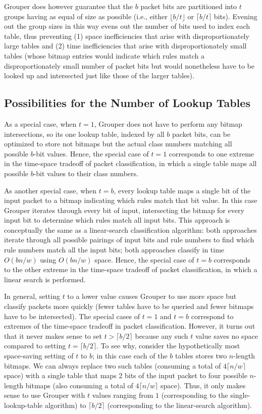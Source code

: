 \documentclass[10pt, conference, compsocconf]{IEEEtran}
\begin{document}
Grouper does however guarantee that the $b$ packet bits are partitioned into $t$
groups having as equal of size as possible (i.e., either $\lfloor b/t\rfloor$ or
$\lceil b/t\rceil$ bits).  Evening out the group sizes in this way evens out the
number of bits used to index each table, thus preventing (1) space
inefficiencies that arise with disproportionately large tables and (2) time
inefficiencies that arise with disproportionately small tables (whose bitmap
entries would indicate which rules match a disproportionately small number of
packet bits but would nonetheless have to be looked up and intersected just like
those of the larger tables).

\subsection{Possibilities for the Number of Lookup Tables}
As a special case, when $t=1$, Grouper does not have to perform any bitmap
intersections, so its one lookup table, indexed by all $b$ packet bits, can be
optimized to store not bitmaps but the actual class numbers matching all
possible $b$-bit values.  Hence, the special case of $t=1$ corresponds to one
extreme in the time-space tradeoff of packet classification, in which a single
table maps all possible $b$-bit values to their class numbers.

As another special case, when $t=b$, every lookup table maps a single bit of the
input packet to a bitmap indicating which rules match that bit value. In this
case Grouper iterates through every bit of input, intersecting the bitmap for
every input bit to determine which rules match all input bits.  This approach is
conceptually the same as a linear-search classification algorithm: both
approaches iterate through all possible pairings of input bits and rule numbers
to find which rule numbers match all the input bits; both approaches classify in
time $O(bn/w)$ using $O(bn/w)$ space.  Hence, the special case of $t=b$
corresponds to the other extreme in the time-space tradeoff of packet
classification, in which a linear search is performed.

In general, setting $t$ to a lower value causes Grouper to use more space but
classify packets more quickly (fewer tables have to be queried and fewer bitmaps
have to be intersected).  The special cases of $t=1$ and $t=b$ correspond to
extremes of the time-space tradeoff in packet classification.  However, it turns
out that it never makes sense to set $t>\lceil b/2\rceil$ because any such $t$
value saves no space compared to setting $t=\lceil b/2\rceil$. To see why,
consider the hypothetically most space-saving setting of $t$ to $b$; in this
case each of the $b$ tables stores two $n$-length bitmaps.  We can always
replace two such tables (consuming a total of $4\lceil n/w\rceil$ space) with a
single table that maps 2 bits of the input packet to four possible $n$-length
bitmaps (also consuming a total of $4\lceil n/w\rceil$ space).  Thus, it only
makes sense to use Grouper with $t$ values ranging from $1$ (corresponding to
the single-lookup-table algorithm) to $\lceil b/2\rceil$ (corresponding to the
linear-search algorithm).
\end{document}
